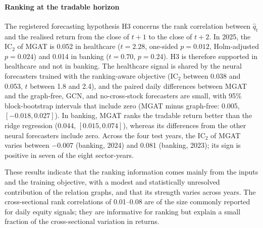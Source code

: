 {\paragraph{Ranking at the tradable horizon}
The registered forecasting hypothesis H3 concerns the rank correlation between $\hat q_t$ and the realised return from the close of $t+1$ to the close of $t+2$. In 2025, the IC$_2$ of MGAT is 0.052 in healthcare ($t=2.28$, one-sided $p=0.012$, Holm-adjusted $p=0.024$) and 0.014 in banking ($t=0.70$, $p=0.24$). H3 is therefore supported in healthcare and not in banking. The healthcare signal is shared by the neural forecasters trained with the ranking-aware objective (IC$_2$ between 0.038 and 0.053, $t$ between 1.8 and 2.4), and the paired daily differences between MGAT and the graph-free, GCN, and no-cross-stock forecasters are small, with 95\% block-bootstrap intervals that include zero (MGAT minus graph-free: 0.005, $[-0.018, 0.027]$). In banking, MGAT ranks the tradable return better than the ridge regression (0.044, $[0.015, 0.074]$), whereas its differences from the other neural forecasters include zero. Across the four test years, the IC$_2$ of MGAT varies between $-0.007$ (banking, 2024) and 0.081 (banking, 2023); its sign is positive in seven of the eight sector-years.

These results indicate that the ranking information comes mainly from the inputs and the training objective, with a modest and statistically unresolved contribution of the relation graphs, and that its strength varies across years. The cross-sectional rank correlations of 0.01--0.08 are of the size commonly reported for daily equity signals; they are informative for ranking but explain a small fraction of the cross-sectional variation in returns.\par}




